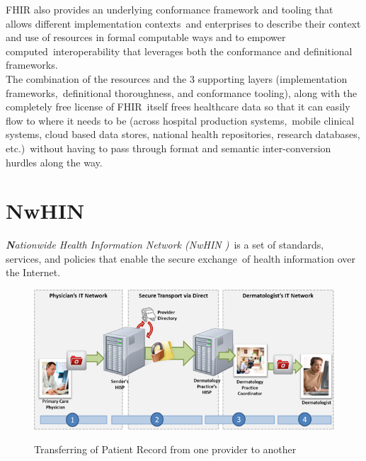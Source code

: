 \documentclass[DIV=calc, paper=a4, fontsize=12pt, onecolumn]{scrartcl}	 %
\newcommand{\initial}[1]{ %
\lettrine[lines=3,lhang=0.3,nindent=0em,slope=0em]{
\color{DarkBlue}
{\textbf{\textit{#1}}}}{}}
\begin{document}
  \noindent FHIR also provides an underlying conformance framework and tooling that allows different implementation contexts\ 
  and enterprises to describe their context and use of resources in formal computable ways and to empower computed\
  interoperability that leverages both the conformance and definitional frameworks.\\

  \noindent The combination of the resources and the 3 supporting layers (implementation frameworks,\
  definitional thoroughness, and conformance tooling), along with the completely free license of FHIR\
  itself frees healthcare data so that it can easily flow to where it needs to be (across hospital production systems,\
  mobile clinical systems, cloud based data stores, national health repositories, research databases, etc.)\
  without having to pass through format and semantic inter-conversion hurdles along the way. \citep{_fhir_framework_2013}\



  \section[Nationwide Health Information Network (NwHIN)]{NwHIN}
  \label{sec:nwhin}

  \initial{N}\textit{ationwide Health Information Network (NwHIN )}\
  is a set of standards, services, and policies that enable the secure exchange\
  of health information over the Internet.\citep{_nwhin_framework_2013}     

  \begin{figure}[ht!]
    \centering
    \includegraphics[scale=0.5]{nwhin.png}
    \caption{Transferring of Patient Record from one provider to another}
    \cite[Fig.~1]{_nwhin_frameworkOne_2013}
    \label{fig:nwhin}
  \end{figure}  
\end{document}
